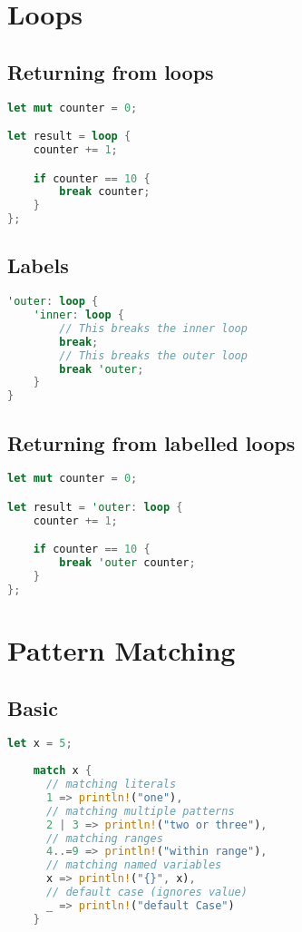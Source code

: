 \documentclass{article}
\begin{document}
\section{Loops}

\subsection{Returning from loops}

\begin{lstlisting}[language=Rust, style=boxed, numbers=none]
let mut counter = 0;

let result = loop {
    counter += 1;

    if counter == 10 {
        break counter;
    }
};
\end{lstlisting}

\subsection{Labels}

\begin{lstlisting}[language=Rust, style=boxed, numbers=none]
'outer: loop {
    'inner: loop {
        // This breaks the inner loop
        break;
        // This breaks the outer loop
        break 'outer;
    }
}
\end{lstlisting}

\subsection{Returning from labelled loops}

\begin{lstlisting}[language=Rust, style=boxed, numbers=none]
let mut counter = 0;

let result = 'outer: loop {
    counter += 1;

    if counter == 10 {
        break 'outer counter;
    }
};
\end{lstlisting}

\section{Pattern Matching}

\subsection{Basic}

\begin{lstlisting}[language=Rust, style=boxed, numbers=none]
    let x = 5;
    
    match x {
      // matching literals
      1 => println!("one"),
      // matching multiple patterns
      2 | 3 => println!("two or three"),
      // matching ranges
      4..=9 => println!("within range"),
      // matching named variables
      x => println!("{}", x),
      // default case (ignores value)
      _ => println!("default Case")
    }
\end{lstlisting}
\end{document}
